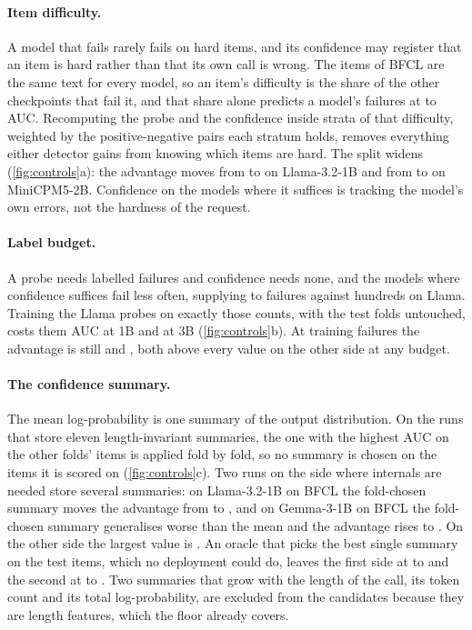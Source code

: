 \paragraph{Item difficulty.}
A model that fails rarely fails on hard items, and its confidence may register that an item is hard rather than that its own call is wrong. The items of BFCL are the same text for every model, so an item's difficulty is the share of the other checkpoints that fail it, and that share alone predicts a model's failures at \diffOnlyMin{} to \diffOnlyMax{} AUC. Recomputing the probe and the confidence inside strata of that difficulty, weighted by the positive-negative pairs each stratum holds, removes everything either detector gains from knowing which items are hard. The split widens (\cref{fig:controls}a): the advantage moves from \diffGapRawLlamaOneB{} to \diffGapWithinLlamaOneB{} on Llama-3.2-1B and from \diffGapRawMiniCpm{} to \diffGapWithinMiniCpm{} on MiniCPM5-2B. Confidence on the models where it suffices is tracking the model's own errors, not the hardness of the request.

\paragraph{Label budget.}
A probe needs labelled failures and confidence needs none, and the models where confidence suffices fail less often, supplying \nPosQwenThreeBfcl{} to \nPosQwenThreeFiveBfcl{} failures against hundreds on Llama. Training the Llama probes on exactly those counts, with the test folds untouched, costs them \budgetProbeDropLlamaOneB{} AUC at 1B and \budgetProbeDropLlamaThreeB{} at 3B (\cref{fig:controls}b). At \budgetMinPosLlamaOneB{} training failures the advantage is still \budgetGapAtMinLlamaOneB{} and \budgetGapAtMinLlamaThreeB{}, both above every value on the other side at any budget.

\paragraph{The confidence summary.}
The mean log-probability is one summary of the output distribution. On the runs that store eleven length-invariant summaries, the one with the highest AUC on the other folds' items is applied fold by fold, so no summary is chosen on the items it is scored on (\cref{fig:controls}c). Two runs on the side where internals are needed store several summaries: on Llama-3.2-1B on BFCL the fold-chosen summary moves the advantage from \GapLlamaOneBBfcl{} to \gapBestLlamaOneBBfcl{}, and on Gemma-3-1B on BFCL the fold-chosen summary generalises worse than the mean and the advantage rises to \gapBestGemmaBfcl{}. On the other side the largest value is \gapBestConfidenceMax{}. An oracle that picks the best single summary on the test items, which no deployment could do, leaves the first side at \gapOracleMinInternals{} to \gapOracleMaxInternals{} and the second at \gapOracleMinConfidence{} to \gapOracleMaxConfidence{}. Two summaries that grow with the length of the call, its token count and its total log-probability, are excluded from the candidates because they are length features, which the floor already covers.

